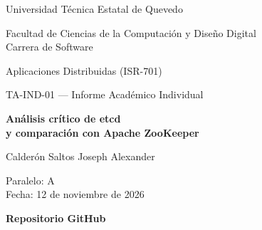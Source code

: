 \documentclass[11pt,a4paper]{article}
\begin{document}
\hypersetup{pageanchor=false}

\begin{titlepage}
\centering

{\Large Universidad Técnica Estatal de Quevedo\par}

\vspace{0.6em}

Facultad de Ciencias de la Computación y Diseño Digital\\
Carrera de Software

\vfill

{\large Aplicaciones Distribuidas (ISR-701)\par}

\vspace{0.5em}

{\large TA-IND-01 --- Informe Académico Individual\par}

\vspace{1.5em}

{\LARGE\bfseries
Análisis crítico de etcd\\[0.3em]
y comparación con Apache ZooKeeper\par}

\vfill

{\large Calderón Saltos Joseph Alexander\par}

\vspace{0.5em}

Paralelo: A\\
Fecha: 12 de noviembre de 2026


\vspace{2em}

{\small\bfseries Repositorio GitHub\par}

\vspace{0.5em}

\href{https://github.com/BelindaTZ/TA-IND-01-Informe-Acad-mico-Individual---CGMT/tree/main/Calderon\%20Joseph}{%
%
}
\par

\vfill

\end{titlepage}

\hypersetup{pageanchor=true}
\end{document}
